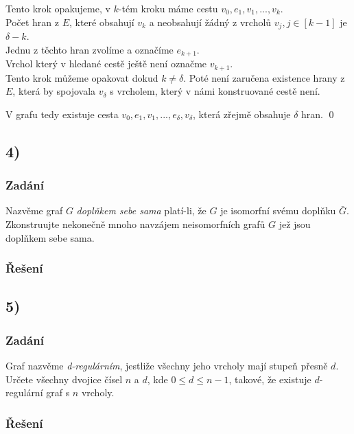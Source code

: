 \documentclass[../main.tex]{subfiles}
\begin{document}
Tento krok opakujeme, v $k$-tém kroku máme cestu $v_0, e_1, v_1, ..., v_k$. \\
Počet hran z $E$, které obsahují $v_k$ a neobsahují žádný z vrcholů $v_j, j\in[k-1]$ je $\delta-k$.\\
Jednu z těchto hran zvolíme a označíme $e_{k+1}$.\\
Vrchol který v hledané cestě ještě není označme $v_{k+1}$.\\


Tento krok můžeme opakovat dokud $k \neq \delta$. Poté není zaručena existence hrany z $E$, 
která by spojovala $v_\delta$ s vrcholem, který v námi konstruované cestě není.

V grafu tedy existuje cesta $v_0, e_1, v_1, ...,e_\delta , v_\delta$, která zřejmě obsahuje $\delta$ hran.
\qed


\subsection*{4)}
\subsubsection*{Zadání}
Nazvěme graf $G$ \textit{doplňkem sebe sama} platí-li, že $G$ je isomorfní svému doplňku $\bar{G}$. 
Zkonstruujte nekonečně mnoho navzájem neisomorfních grafů $G$ jež jsou doplňkem sebe sama.
\subsubsection*{Řešení}



\subsection*{5)}
\subsubsection*{Zadání}
Graf nazvěme \textit{d-regulárním}, jestliže všechny jeho vrcholy mají stupeň přesně $d$. 
Určete všechny dvojice čísel $n$ a $d$, kde $0\leq d\leq n-1$, takové, že existuje $d$-regulární graf s $n$ vrcholy.
\subsubsection*{Řešení}
\end{document}
